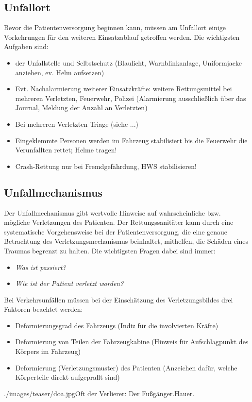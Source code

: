 \subsection{Unfallort}
Bevor die Patientenversorgung beginnen kann, müssen am Unfallort einige
Vorkehrungen für den weiteren Einsatzablauf getroffen werden. Die wichtigsten
Aufgaben sind:
\begin{itemize}
  \item {} der Unfallstelle und Selbstschutz
  (Blaulicht, Warnblinkanlage, Uniformjacke anziehen, ev. Helm aufsetzen)
  \item Evt. Nachalarmierung weiterer Einsatzkräfte:
  weitere Rettungsmittel bei mehreren Verletzten, Feuerwehr, Polizei
  (Alarmierung ausschließlich über das Journal, Meldung der Anzahl an Verletzten)
  \item Bei mehreren Verletzten Triage (siehe ...)
  \item Eingeklemmte Personen werden im Fahrzeug stabilisiert bis die Feuerwehr
  die Verunfallten rettet; Helme tragen!
  \item Crash-Rettung nur bei Fremdgefährdung, HWS stabilisieren!
\end{itemize}

\subsection{Unfallmechanismus}
Der Unfallmechanismus gibt wertvolle Hinweise auf wahrscheinliche bzw. mögliche
Verletzungen des Patienten. Der Rettungssanitäter kann durch eine systematische
Vorgehensweise bei der Patientenversorgung, die eine genaue Betrachtung des
Verletzungsmechanismus beinhaltet, mithelfen, die Schäden eines Traumas begrenzt
zu halten. Die wichtigsten Fragen dabei sind immer:
\begin{itemize}
    \item \emph{Was ist passiert?}
    \item \emph{Wie ist der Patient verletzt worden?}
\end{itemize}

{ Bei Verkehrsunfällen müssen bei der Einschätzung des Verletzungsbildes drei
Faktoren beachtet werden:
\begin{itemize}
  \item Deformierungsgrad des Fahrzeugs (Indiz für die involvierten Kräfte)
  \item Deformierung von Teilen der Fahrzeugkabine (Hinweis für Aufschlagpunkt
  des Körpers im Fahrzeug)
  \item Deformierung (Verletzungsmuster) des Patienten (Anzeichen dafür,
  welche Körperteile direkt aufgeprallt sind)
\end{itemize}
}{
\SymbolText
}{./images/teaser/doa.jpg}{Oft der Verlierer: Der
Fußgänger.}{Hauer.}



